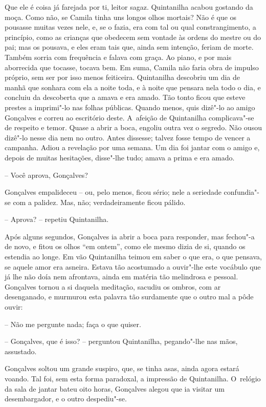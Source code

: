 Que ele é coisa já farejada por ti, leitor sagaz. Quintanilha acabou
gostando da moça. Como não, se Camila tinha uns longos olhos mortais?
Não é que os pousasse muitas vezes nele, e, se o fazia, era com tal ou
qual constrangimento, a princípio, como as crianças que obedecem sem
vontade às ordens do mestre ou do pai; mas os pousava, e eles eram tais
que, ainda sem intenção, feriam de morte. Também sorria com frequência e
falava com graça. Ao piano, e por mais aborrecida que tocasse, tocava
bem. Em suma, Camila não faria obra de impulso próprio, sem ser por isso
menos feiticeira. Quintanilha descobriu um dia de manhã que sonhara com
ela a noite toda, e à noite que pensara nela todo o dia, e concluiu da
descoberta que a amava e era amado. Tão tonto ficou que esteve prestes a
imprimi"-lo nas folhas públicas. Quando menos, quis dizê"-lo ao amigo
Gonçalves e correu ao escritório deste. A~afeição de Quintanilha
complicava"-se de respeito e temor. Quase a abrir a boca, engoliu outra
vez o segredo. Não ousou dizê"-lo nesse dia nem no outro. Antes dissesse;
talvez fosse tempo de vencer a campanha. Adiou a revelação por uma
semana. Um dia foi jantar com o amigo e, depois de muitas hesitações,
disse"-lhe tudo; amava a prima e era amado.

-- Você aprova, Gonçalves?

Gonçalves empalideceu -- ou, pelo menos, ficou sério; nele a seriedade
confundia"-se com a palidez. Mas, não; verdadeiramente ficou pálido.

-- Aprova? -- repetiu Quintanilha.

Após alguns segundos, Gonçalves ia abrir a boca para responder, mas
fechou"-a de novo, e fitou os olhos ``em ontem'', como ele mesmo dizia de
si, quando os estendia ao longe. Em vão Quintanilha teimou em saber o
que era, o que pensava, se aquele amor era asneira. Estava tão
acostumado a ouvir"-lhe este vocábulo que já lhe não doía nem afrontava,
ainda em matéria tão melindrosa e pessoal. Gonçalves tornou a si daquela
meditação, sacudiu os ombros, com ar desenganado, e murmurou esta
palavra tão surdamente que o outro mal a pôde ouvir:

-- Não me pergunte nada; faça o que quiser.

-- Gonçalves, que é isso? -- perguntou Quintanilha, pegando"-lhe nas
mãos, assustado.

Gonçalves soltou um grande suspiro, que, se tinha asas, ainda agora
estará voando. Tal foi, sem esta forma paradoxal, a impressão de
Quintanilha. O~relógio da sala de jantar bateu oito horas, Gonçalves
alegou que ia visitar um desembargador, e o outro despediu"-se.

